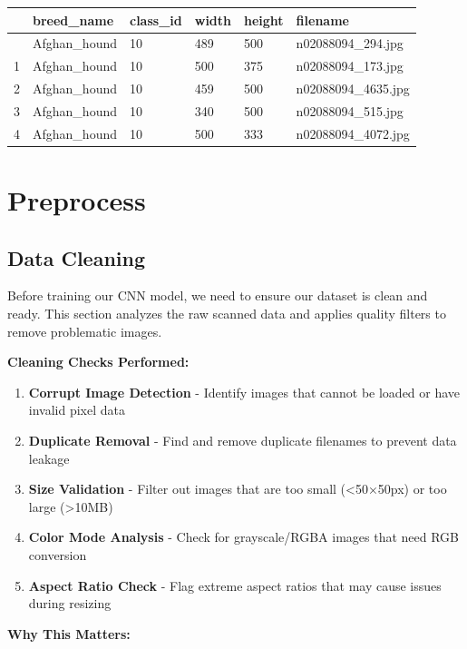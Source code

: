 \documentclass[
  letterpaper,
  DIV=11,
  numbers=noendperiod]{scrartcl}
\providecommand{\tightlist}{%
  \setlength{\itemsep}{0pt}\setlength{\parskip}{0pt}}
\begin{document}
\begin{longtable}[]{@{}llllll@{}}
\toprule\noalign{}
& breed\_name & class\_id & width & height & filename \\
\midrule\noalign{}
\endhead
\bottomrule\noalign{}
\endlastfoot
0 & Afghan\_hound & 10 & 489 & 500 & n02088094\_294.jpg \\
1 & Afghan\_hound & 10 & 500 & 375 & n02088094\_173.jpg \\
2 & Afghan\_hound & 10 & 459 & 500 & n02088094\_4635.jpg \\
3 & Afghan\_hound & 10 & 340 & 500 & n02088094\_515.jpg \\
4 & Afghan\_hound & 10 & 500 & 333 & n02088094\_4072.jpg \\
\end{longtable}

\section{Preprocess}\label{preprocess}

\subsection{Data Cleaning}\label{data-cleaning}

Before training our CNN model, we need to ensure our dataset is clean
and ready. This section analyzes the raw scanned data and applies
quality filters to remove problematic images.

\textbf{Cleaning Checks Performed:}

\begin{enumerate}
\def\labelenumi{\arabic{enumi}.}
\tightlist
\item
  \textbf{Corrupt Image Detection} - Identify images that cannot be
  loaded or have invalid pixel data
\item
  \textbf{Duplicate Removal} - Find and remove duplicate filenames to
  prevent data leakage
\item
  \textbf{Size Validation} - Filter out images that are too small
  (\textless50×50px) or too large (\textgreater10MB)
\item
  \textbf{Color Mode Analysis} - Check for grayscale/RGBA images that
  need RGB conversion
\item
  \textbf{Aspect Ratio Check} - Flag extreme aspect ratios that may
  cause issues during resizing
\end{enumerate}

\textbf{Why This Matters:}
\end{document}
